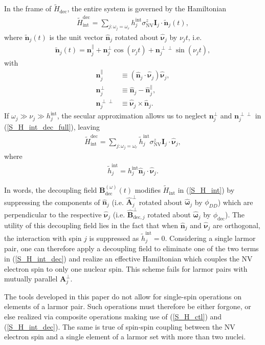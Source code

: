 \documentclass[twocolumn]{revtex4-1}
\renewcommand{\t}{\text} %
\newcommand{\p}[1]{\left(#1\right)} %
\renewcommand{\v}{\bm} %
\newcommand{\uv}[1]{\hat{\v{#1}}} %
\renewcommand{\c}{\cdot} %
\newcommand{\NV}{\t{NV}}
\begin{document}
In the frame of $\tilde H_\t{dec}$, the entire system is governed by
the Hamiltonian
\begin{align}
  \tilde H_\t{int}^\t{dec} = \sum_{j:\omega_j=\omega_r}
  h_j^\t{int}\sigma_\NV^z\v I_j\c\tilde{\v n}_j\p{t},
  \label{S_H_int_dec_full}
\end{align}
where $\tilde{\v n}_j\p{t}$ is the unit vector $\uv n_j$ rotated about
$\uv\nu_j$ by $\nu_jt$, i.e.
\begin{align}
  \tilde{\v n}_j\p{t} = \v n_j^\parallel +
  \v n_j^\perp\cos\p{\nu_jt} + \v n_j^{\perp\perp}\sin\p{\nu_jt},
\end{align}
with
\begin{align}
  \v n_j^\parallel &\equiv \p{\uv n_j\c\uv\nu_j}\uv\nu_j, \\
  \v n_j^\perp &\equiv \uv n_j - \uv n_j^\parallel, \\
  \v n_j^{\perp\perp} &\equiv \uv\nu_j\times\uv n_j.
\end{align}
If $\omega_j\gg\nu_j\gg h_j^\t{int}$, the secular approximation allows
us to neglect $\v n_j^\perp$ and $\v n_j^{\perp\perp}$ in
(\ref{S_H_int_dec_full}), leaving
\begin{align}
  \tilde H_\t{int}^\t{dec}
  = \sum_{j:\omega_j=\omega_r}
  \tilde h_j^\t{int}\sigma_\NV^z\v I_j\c\uv\nu_j,
  \label{S_H_int_dec}
\end{align}
where
\begin{align}
  \tilde h_j^\t{int} = h_j^\t{int}\uv n_j\c\uv\nu_j.
\end{align}

In words, the decoupling field $\v B_\t{dec}^{\p\omega}\p{t}$ modifies
$\tilde H_\t{int}$ in (\ref{S_H_int}) by suppressing the components of
$\uv n_j$ (i.e. $\uv A_j^\perp$ rotated about $\uv\omega_j$ by
$\phi_{DD}$) which are perpendicular to the respective $\uv\nu_j$
(i.e.  $\uv B_{\t{dec},j}^\perp$ rotated about $\uv\omega_j$ by
$\phi_\t{dec}$). The utility of this decoupling field lies in the fact
that when $\uv n_j$ and $\uv\nu_j$ are orthogonal, the interaction
with spin $j$ is suppressed as $\tilde h_j^\t{int}=0$. Considering a
single larmor pair, one can therefore apply a decoupling field to
eliminate one of the two terms in (\ref{S_H_int_dec}) and realize an
effective Hamiltonian which couples the NV electron spin to only one
nuclear spin. This scheme fails for larmor pairs with mutually
parallel $\v A_j^\perp$.

The tools developed in this paper do not allow for single-spin
operations on elements of a larmor pair. Such operations must
therefore be either forgone, or else realized via composite operations
making use of (\ref{S_H_ctl}) and (\ref{S_H_int_dec}). The same is
true of spin-spin coupling between the NV electron spin and a single
element of a larmor set with more than two nuclei.
\end{document}
